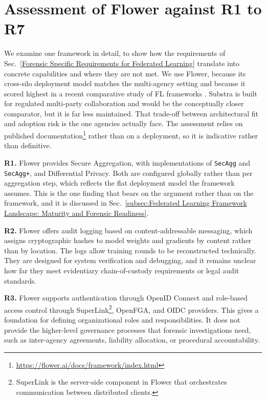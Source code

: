 
\section{Assessment of Flower against R1 to R7}
\label{appendix:flower}

We examine one framework in detail, to show how the requirements of Sec.~\ref{Forensic Specific Requirements for Federated Learning} translate into concrete capabilities and where they are not met. We use Flower, because its cross-silo deployment model matches the multi-agency setting and because it scored highest in a recent comparative study of FL frameworks \citep{riedel2024comparative}. Substra \citep{substra} is built for regulated multi-party collaboration and would be the conceptually closer comparator, but it is far less maintained. That trade-off between architectural fit and adoption risk is the one agencies actually face. The assessment relies on published documentation\footnote{\url{https://flower.ai/docs/framework/index.html}} rather than on a deployment, so it is indicative rather than definitive.


\textbf{R1.} Flower provides Secure Aggregation, with implementations of \texttt{SecAgg} and \texttt{SecAgg+}, and Differential Privacy. Both are configured globally rather than per aggregation step, which reflects the flat deployment model the framework assumes. This is the one finding that bears on the argument rather than on the framework, and it is discussed in Sec.~\ref{subsec:Federated Learning Framework Landscape: Maturity and Forensic Readiness}.

\textbf{R2.} Flower offers audit logging based on content-addressable messaging, which assigns cryptographic hashes to model weights and gradients by content rather than by location. The logs allow training rounds to be reconstructed technically. They are designed for system verification and debugging, and it remains unclear how far they meet evidentiary chain-of-custody requirements or legal audit standards.

\textbf{R3.} Flower supports authentication through OpenID Connect and role-based access control through SuperLink\footnote{SuperLink is the server-side component in Flower that orchestrates communication between distributed clients.}, OpenFGA, and OIDC providers. This gives a foundation for defining organizational roles and responsibilities. It does not provide the higher-level governance processes that forensic investigations need, such as inter-agency agreements, liability allocation, or procedural accountability.

